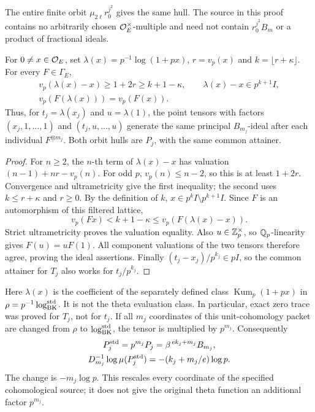 The entire finite orbit $\mu_{2\ell}r_0^{j^2}$ gives the
same hull. The source in this proof contains no arbitrarily
chosen $\mathcal O_E^\times$-multiple and need not contain
$r_0^{j^2}B_m$ or a product of fractional ideals.

\begin{proposition}
\label{prop:utp-logarithmic-bridge}
For $0\ne x\in\mathcal O_E$, set
$\lambda(x)=p^{-1}\log(1+px)$, $r=v_p(x)$ and
$k=\lfloor r+\kappa\rfloor$. For every $F\in\Gamma_E$,
\begin{equation}\label{eq:utp-tail}
 \begin{gathered}
 v_p(\lambda(x)-x)\ge1+2r\ge k+1-\kappa,\qquad
 \lambda(x)-x\in p^{k+1}I,\\
                       v_p(F(\lambda(x)))=v_p(F(x)).
 \end{gathered}
\end{equation}
Thus, for $t_j=\lambda(x_j)$ and $u=\lambda(1)$, the
point tensors with factors $(x_j,1,\ldots,1)$ and
$(t_j,u,\ldots,u)$ generate the same principal
$B_{m_j}$-ideal after each individual $F^{\otimes m_j}$.
Both orbit hulls are $P_j$, with the same common attainer.
\end{proposition}
\begin{proof}
For $n\ge2$, the $n$-th term of $\lambda(x)-x$ has valuation
$(n-1)+nr-v_p(n)$. For odd $p$, $v_p(n)\le n-2$,
so this is at least $1+2r$. Convergence and
ultrametricity give the first inequality; the second
uses $k\le r+\kappa$ and $r\ge0$.
By the definition of $k$, $x\in p^kI\setminus p^{k+1}I$.
Since $F$ is an automorphism of this filtered lattice,
\[
 v_p(Fx)<k+1-\kappa
                    \le v_p(F(\lambda(x)-x)).
 \]
Strict ultrametricity proves the valuation equality.
Also $u\in\mathbb Z_p^\times$, so $\mathbb Q_p$-linearity gives
$F(u)=uF(1)$. All component valuations of the two
tensors therefore agree, proving the ideal assertions.
Finally $(t_j-x_j)/p^{k_j}\in pI$, so the common
attainer for $T_j$ also works for $t_j/p^{k_j}$.
\end{proof}

Here $\lambda(x)$ is the coefficient of the separately
defined class $\operatorname{Kum}_p(1+px)$ in
$\rho=p^{-1}\log_{\rm BK}^{\rm std}$. It is not the
theta evaluation class. In particular, exact zero trace
was proved for $T_j$, not for $t_j$.
If all $m_j$ coordinates of this unit-cohomology packet
are changed from $\rho$ to $\log_{\rm BK}^{\rm std}$,
the tensor is multiplied by $p^{m_j}$. Consequently
\begin{equation}\label{eq:utp-standard-scale}
 \begin{gathered}
 P_j^{\rm std}=p^{m_j}P_j
                 =\beta^{\,e k_j+m_j}B_{m_j},\\
 D_{m_j}^{-1}\log\mu(P_j^{\rm std})
                       =-(k_j+m_j/e)\log p .
 \end{gathered}
\end{equation}
The change is $-m_j\log p$. This rescales every coordinate
of the specified cohomological source; it does not give the
original theta function an additional factor $p^{m_j}$.

